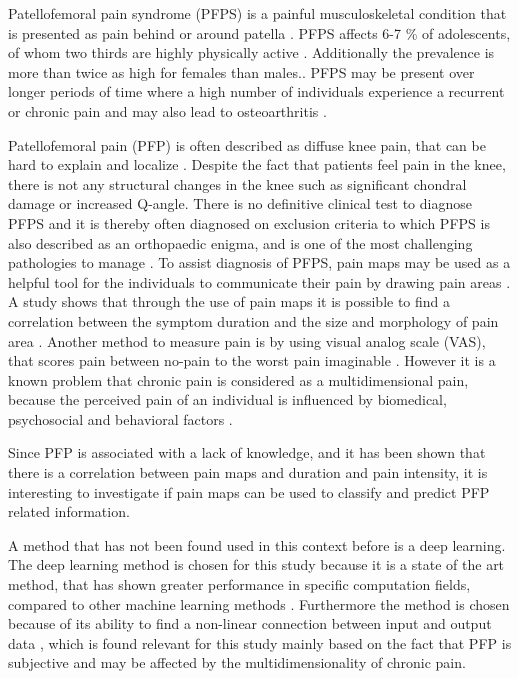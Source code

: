 Patellofemoral pain syndrome (PFPS) is a painful musculoskeletal condition that is presented as pain behind or around patella \citep{Maclachlan2017, Smith2015}. PFPS affects 6-7 \% of adolescents, of whom two thirds are highly physically active \citep{Rathleff2015}. Additionally the prevalence is more than twice as high for females than males.\citep{Petersen2013, Rathleff2015}.
PFPS may be present over longer periods of time where a high number of individuals experience a recurrent or chronic pain \citep{Witvrouw2014} and may also lead to osteoarthritis \citep{Petersen2013, Crossley2016}.

\noindent
Patellofemoral pain (PFP) is often described as diffuse knee pain, that can be hard to explain and localize \citep{Witvrouw2014}. Despite the fact that patients feel pain in the knee, there is not any structural changes in the knee such as significant chondral damage or increased Q-angle. There is no definitive clinical test to diagnose PFPS and it is thereby often diagnosed on exclusion criteria \citep{Petersen2013} to which PFPS is also described as an orthopaedic enigma, and is one of the most challenging pathologies to manage \citep{Dye2001}. 
To assist diagnosis of PFPS, pain maps may be used as a helpful tool for the individuals to communicate their pain by drawing pain areas \citep{Boudreau2016}. A study shows that through the use of pain maps it is possible to find a correlation between the symptom duration and the size and morphology of pain area \citep{Boudreau2017}. 
Another method to measure pain is by using visual analog scale (VAS), that scores pain between no-pain to the worst pain imaginable \citep{Haefeli2005}. However it is a known problem that chronic pain is considered as a multidimensional pain, because the perceived pain of an individual is influenced by biomedical, psychosocial and behavioral factors \citep{Dansie2013}.

\noindent
Since PFP is associated with a lack of knowledge, and it has been shown that there is a correlation between pain maps and duration and pain intensity, it is interesting to investigate if pain maps can be used to classify and predict PFP related information. 

\noindent
A method that has not been found used in this context before is a deep learning. The deep learning method is chosen for this study because it is a state of the art method, that has shown greater performance in specific computation fields, compared to other machine learning methods \citep{LeCun2015}.
Furthermore the method is chosen because of its ability to find a non-linear connection between input and output data \citep{LeCun2015}, which is found relevant for this study mainly based on the fact that PFP is subjective and may be affected by the multidimensionality of chronic pain.  \\



